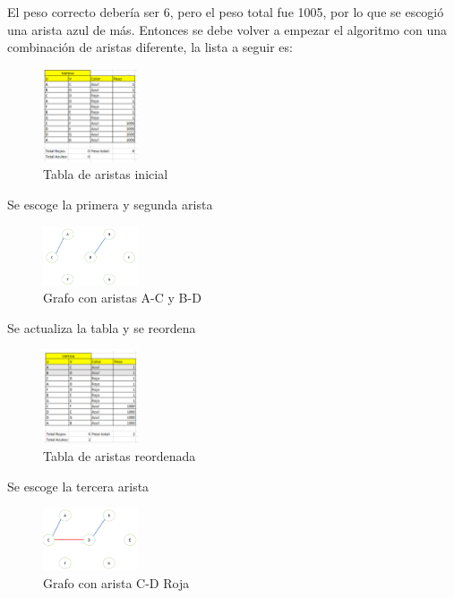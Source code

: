 \documentclass[conference,compsoc]{IEEEtran}
\begin{document}
El peso correcto debería ser 6, pero el peso total fue 1005, por lo que se escogió una arista azul de más.
Entonces se debe volver a empezar el algoritmo con una combinación de aristas diferente, la lista a seguir es:

\begin{figure}[h] 
    \centering
    \includegraphics[width=0.25\textwidth]{Problema2/s12.png}
    \caption{Tabla de aristas inicial}
    \label{fig:mesh1}
\end{figure}
$$$$
Se escoge la primera y segunda arista
\begin{figure}[h] 
    \centering
    \includegraphics[width=0.25\textwidth]{Problema2/s13.png}
    \caption{Grafo con aristas A-C y B-D}
    \label{fig:mesh1}
\end{figure}

Se actualiza la tabla y se reordena
\begin{figure}[h] 
    \centering
    \includegraphics[width=0.25\textwidth]{Problema2/s14.png}
    \caption{Tabla de aristas reordenada}
    \label{fig:mesh1}
\end{figure}

Se escoge la tercera arista
\begin{figure}[h] 
    \centering
    \includegraphics[width=0.25\textwidth]{Problema2/s15.png}
    \caption{Grafo con arista C-D Roja}
    \label{fig:mesh1}
\end{figure}
\end{document}
